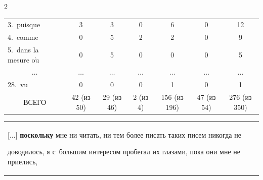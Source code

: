 \begin{multicols}{2}
\begin{table}
\begin{center}
\begin{tabular}{|l|c|c|c|c|c|c|}
\hspace*{11.5mm}3.\ puisque&3&3&0&6&0&12\\


\hspace*{11.5mm}4.\ comme&0&5&2&2&0&\hphantom{9}9\\


\hspace*{11.5mm}5.\ dans la mesure o$\grave{\mbox{u}}$&0&5&0&0&0&\hphantom{9}5\\


\multicolumn{1}{|c|}{$\ldots$}&$\ldots$&$\ldots$&$\ldots$&$\ldots$&$\ldots$&$\ldots$\\


\hspace*{11.5mm}28.\ vu&0&0&0&1&0&\hphantom{9}1\\


\hline


\multicolumn{1}{|c|}{ВСЕГО}&42  (из 50)&29  (из 46)&2  (из 4)&156  (из 196)&47  (из 54)&276  (из 350)\\


\hline


\end{tabular}


\end{center}


\vspace*{-3pt}


\end{table}


\begin{table}[b]\small %


\vspace*{-9pt}


\begin{center}




\vspace*{2ex}





\begin{tabular}{|p{74mm}|p{84mm}|}


\hline


[$\ldots$] \textbf{поскольку} мне ни читать, ни тем более писать таких писем никогда не 


доводилось, я с~большим интересом пробегал их глазами, пока они мне не приелись, 



\end{tabular}
\end{center}
\end{table}
\end{multicols}
